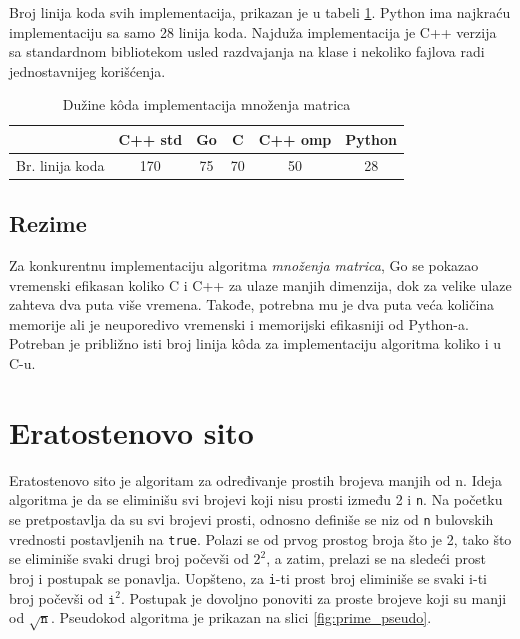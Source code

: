 \documentclass[12pt,oneside]{memoir}
\begin{document}
Broj linija koda svih  implementacija, prikazan je u tabeli \ref{tab:matrix2}. Python ima najkraću implementaciju sa samo 28 linija koda. Najduža implementacija je C++ verzija sa standardnom bibliotekom usled razdvajanja na klase i nekoliko fajlova radi jednostavnijeg korišćenja.  

\begin{table}
\begin{center}
\caption{Dužine k\^{o}da implementacija množenja matrica}
\begin{tabular}{|c|c|c|c|c|c|}
\hline
		& C++ std	&  Go 	& C	& C++ omp	& Python	\\ \hline
Br. linija koda&170		& 75	& 70	&50		&28		\\ \hline
\end{tabular}
\label{tab:matrix2}
\end{center}
\end{table}

\subsection{Rezime}

Za konkurentnu implementaciju algoritma \textit{množenja matrica}, Go se pokazao vremenski efikasan koliko C i C++ za ulaze manjih dimenzija, dok za velike ulaze zahteva dva puta više vremena. Takođe, potrebna mu je dva puta veća količina memorije ali je neuporedivo vremenski i memorijski efikasniji od Python-a. Potreban je približno isti broj linija k\^{o}da za implementaciju algoritma koliko i u C-u.


\section{Eratostenovo sito} \label{erathost}
Eratostenovo sito je algoritam za određivanje prostih brojeva manjih od n. Ideja algoritma je da se eliminišu svi brojevi koji nisu prosti između 2 i \texttt{n}. Na početku se pretpostavlja da su svi brojevi prosti, odnosno definiše se niz od \texttt{n} bulovskih vrednosti postavljenih na \texttt{true}. Polazi se od prvog prostog broja što je 2, tako što se eliminiše svaki drugi broj počevši od $2^{2}$, a zatim, prelazi se na sledeći prost broj i postupak se ponavlja. Uopšteno, za \texttt{i}-ti prost broj eliminiše se svaki i-ti broj počevši od  $\texttt{i}^{2}$. Postupak je dovoljno ponoviti za proste brojeve koji su manji od $\sqrt{\texttt{n}}$. Pseudokod algoritma je prikazan na slici \ref{fig:prime_pseudo}.
\end{document}

